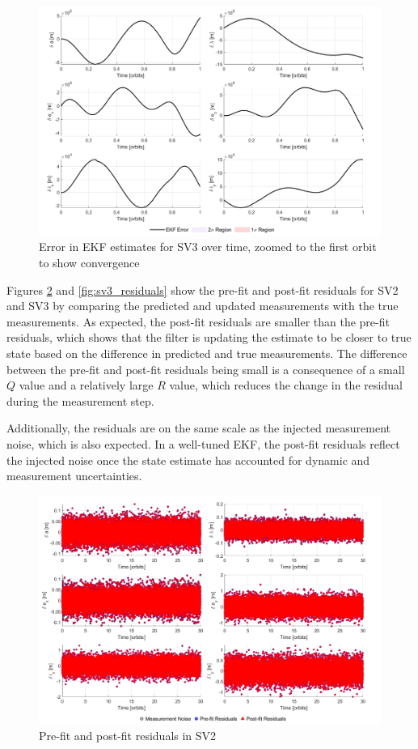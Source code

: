 \begin{figure}[H]
    \centering
    \includegraphics[width=0.7\linewidth]{sim/figures/PS8/EKF_error_SV3_zoomed.png}
    \caption{Error in EKF estimates for SV3 over time, zoomed to the first orbit to show convergence}
    \label{fig:sv3_ekf_error_zoomed}
\end{figure}

Figures \ref{fig:sv2_residuals} and \ref{fig:sv3_residuals} show the pre-fit and post-fit residuals for SV2 and SV3 by comparing the predicted and updated measurements with the true measurements. As expected, the post-fit residuals are smaller than the pre-fit residuals, which shows that the filter is updating the estimate to be closer to true state based on the difference in predicted and true measurements. The difference between the pre-fit and post-fit residuals being small is a consequence of a small $Q$ value and a relatively large $R$ value, which reduces the change in the residual during the measurement step. 

Additionally, the residuals are on the same scale as the injected measurement noise, which is also expected. In a well-tuned EKF, the post-fit residuals reflect the injected noise once the state estimate has accounted for dynamic and measurement uncertainties. 

\begin{figure}[H]
    \centering
    \includegraphics[width=0.7\linewidth]{sim/figures/PS8/residuals_SV2.png}
    \caption{Pre-fit and post-fit residuals in SV2}
    \label{fig:sv2_residuals}
\end{figure}

